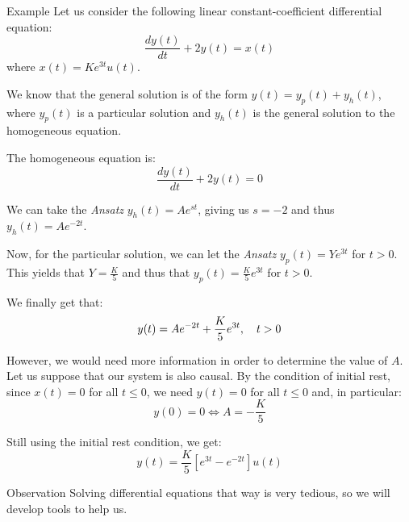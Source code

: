 \documentclass[a4paper]{article}
\begin{document}
\begin{parag}{Example}
    Let us consider the following linear constant-coefficient differential equation: 
    \[\frac{dy\left(t\right)}{dt} + 2y\left(t\right) = x\left(t\right)\]
    where $x\left(t\right) = Ke^{3t}u\left(t\right)$.

    We know that the general solution is of the form $y\left(t\right) = y_p\left(t\right) + y_h\left(t\right)$, where $y_p\left(t\right)$ is a particular solution and $y_h\left(t\right)$ is the general solution to the homogeneous equation.

    The homogeneous equation is: 
    \[\frac{dy\left(t\right)}{dt} + 2y\left(t\right) = 0\]
    
    We can take the \textit{Ansatz} $y_h\left(t\right) = Ae^{s t}$, giving us $s = -2$ and thus $y_h\left(t\right) = Ae^{-2t}$.

    Now, for the particular solution, we can let the \textit{Ansatz} $y_p\left(t\right) = Ye^{3t}$ for $t > 0$. This yields that $Y = \frac{K}{5}$ and thus that $y_p\left(t\right) = \frac{K}{5} e^{3t}$ for $t > 0$.

    We finally get that: 
    \[y\left(t\right) = A e^{-2t} + \frac{K}{5} e^{3t}, \mathspace t > 0\]
    
    However, we would need more information in order to determine the value of $A$. Let us suppose that our system is also causal. By the condition of initial rest, since $x\left(t\right) = 0$ for all $t \leq 0$, we need $y\left(t\right) = 0$ for all $t \leq 0$ and, in particular:
    \[y\left(0\right) = 0 \iff A = -\frac{K}{5}\]

    Still using the initial rest condition, we get: 
    \[y\left(t\right) = \frac{K}{5}\left[e^{3t} - e^{-2t}\right]u\left(t\right)\]
    
    \begin{subparag}{Observation}
        Solving differential equations that way is very tedious, so we will develop tools to help us.
    \end{subparag}
    
\end{parag}




 
\end{document}
